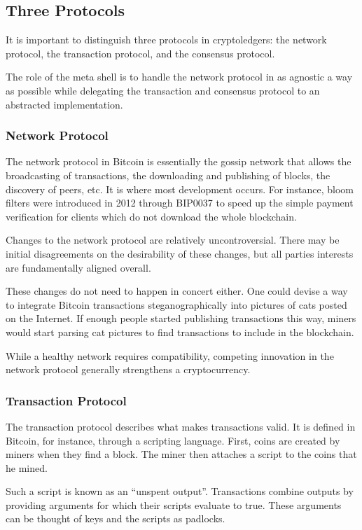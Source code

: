 \documentclass[letterpaper]{article}
\begin{document}
\subsection{Three Protocols}

It is important to distinguish three protocols in cryptoledgers:
the network protocol, the transaction protocol, and the consensus protocol.

The role of the meta shell is to handle the network protocol
in as agnostic a way as possible while delegating the transaction and consensus
protocol to an abstracted implementation.

\subsubsection{Network Protocol}

The network protocol in Bitcoin is essentially the gossip network that allows
the broadcasting of transactions, the downloading and publishing of blocks,
the discovery of peers, etc. It is where most development occurs. For instance,
bloom filters were introduced in 2012 through BIP0037 to speed up the simple
payment verification for clients which do not download the whole blockchain.

Changes to the network protocol are relatively uncontroversial. There
may be initial disagreements on the desirability of these changes, but all
parties interests are fundamentally aligned overall.

These changes do not need to happen in concert either. One could devise a way to
integrate Bitcoin transactions steganographically into pictures of cats posted
on the Internet. If enough people started publishing transactions this way,
miners would start parsing cat pictures to find transactions to include in the
blockchain.

While a healthy network requires compatibility, competing innovation in the
network protocol generally strengthens a cryptocurrency.

\subsubsection{Transaction Protocol}
The transaction protocol describes what makes transactions valid. It is defined
in Bitcoin, for instance, through a scripting language. First, coins are created
by miners when they find a block. The miner then attaches a script to the coins
that he mined.

Such a script is known as an ``unspent output''. Transactions combine outputs
by providing arguments for which their scripts evaluate to true. These arguments
can be thought of keys and the scripts as padlocks.
\end{document}
